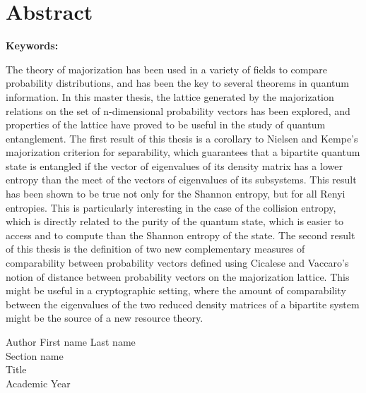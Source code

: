 \chapter*{Abstract}


\textbf{Keywords:}

The theory of majorization has been used in a variety of fields to compare probability distributions, and has been the key to several theorems in quantum information. In this master thesis, the lattice generated by the majorization relations on the set of n-dimensional probability vectors has been explored, and properties of the lattice have proved to be useful in the study of quantum entanglement. The first result of this thesis is a corollary to Nielsen and Kempe's majorization criterion for separability, which guarantees that a bipartite quantum state is entangled if the vector of eigenvalues of its density matrix has a lower entropy than the meet of the vectors of eigenvalues of its subsystems. This result has been shown to be true not only for the Shannon entropy, but for all Renyi entropies. This is particularly interesting in the case of the collision entropy, which is directly related to the purity of the quantum state, which is easier to access and to compute than the Shannon entropy of the state. The second result of this thesis is the definition of two new complementary measures of comparability between probability vectors defined using Cicalese and Vaccaro's notion of distance between probability vectors on the majorization lattice. This might be useful in a cryptographic setting, where the amount of comparability between the eigenvalues of the two reduced density matrices of a bipartite system might be the source of a new resource theory.

\vspace*{\fill}
\noindent Author First name Last name\\
Section name\\
Title\\
Academic Year
